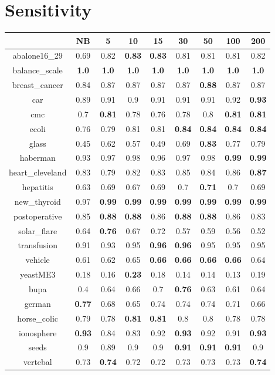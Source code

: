 \documentclass{article}%
\begin{document}
%
\section*{Sensitivity}%
\begin{tabular}{c|cccccccc}%
\hline%
&NB&5&10&15&30&50&100&200\\%
\hline%
abalone16\_29&0.69&0.82&\textbf{0.83}&\textbf{0.83}&0.81&0.81&0.81&0.82\\%
\hline%
balance\_scale&\textbf{1.0}&\textbf{1.0}&\textbf{1.0}&\textbf{1.0}&\textbf{1.0}&\textbf{1.0}&\textbf{1.0}&\textbf{1.0}\\%
\hline%
breast\_cancer&0.84&0.87&0.87&0.87&0.87&\textbf{0.88}&0.87&0.87\\%
\hline%
car&0.89&0.91&0.9&0.91&0.91&0.91&0.92&\textbf{0.93}\\%
\hline%
cmc&0.7&\textbf{0.81}&0.78&0.76&0.78&0.8&\textbf{0.81}&\textbf{0.81}\\%
\hline%
ecoli&0.76&0.79&0.81&0.81&\textbf{0.84}&\textbf{0.84}&\textbf{0.84}&\textbf{0.84}\\%
\hline%
glass&0.45&0.62&0.57&0.49&0.69&\textbf{0.83}&0.77&0.79\\%
\hline%
haberman&0.93&0.97&0.98&0.96&0.97&0.98&\textbf{0.99}&\textbf{0.99}\\%
\hline%
heart\_cleveland&0.83&0.79&0.82&0.83&0.85&0.84&0.86&\textbf{0.87}\\%
\hline%
hepatitis&0.63&0.69&0.67&0.69&0.7&\textbf{0.71}&0.7&0.69\\%
\hline%
new\_thyroid&0.97&\textbf{0.99}&\textbf{0.99}&\textbf{0.99}&\textbf{0.99}&\textbf{0.99}&\textbf{0.99}&\textbf{0.99}\\%
\hline%
postoperative&0.85&\textbf{0.88}&\textbf{0.88}&0.86&\textbf{0.88}&\textbf{0.88}&0.86&0.83\\%
\hline%
solar\_flare&0.64&\textbf{0.76}&0.67&0.72&0.57&0.59&0.56&0.52\\%
\hline%
transfusion&0.91&0.93&0.95&\textbf{0.96}&\textbf{0.96}&0.95&0.95&0.95\\%
\hline%
vehicle&0.61&0.62&0.65&\textbf{0.66}&\textbf{0.66}&\textbf{0.66}&\textbf{0.66}&0.64\\%
\hline%
yeastME3&0.18&0.16&\textbf{0.23}&0.18&0.14&0.14&0.13&0.19\\%
\hline%
bupa&0.4&0.64&0.66&0.7&\textbf{0.76}&0.63&0.61&0.64\\%
\hline%
german&\textbf{0.77}&0.68&0.65&0.74&0.74&0.74&0.71&0.66\\%
\hline%
horse\_colic&0.79&0.78&\textbf{0.81}&\textbf{0.81}&0.8&0.8&0.78&0.78\\%
\hline%
ionosphere&\textbf{0.93}&0.84&0.83&0.92&\textbf{0.93}&0.92&0.91&\textbf{0.93}\\%
\hline%
seeds&0.9&0.89&0.9&0.9&\textbf{0.91}&\textbf{0.91}&\textbf{0.91}&0.9\\%
\hline%
vertebal&0.73&\textbf{0.74}&0.72&0.72&0.73&0.73&0.73&\textbf{0.74}\\%
\hline%
\end{tabular}
\end{document}
